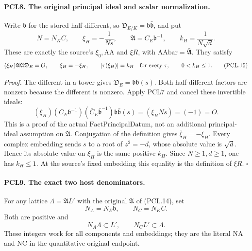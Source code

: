 \paragraph{PCL8. The original principal ideal and scalar normalization.}
\label{claim:PCL8}
Write \(\mathfrak b\) for the stored half-different, so
\(\mathfrak D_{E/K}=\mathfrak b\bar{\mathfrak b}\), and put
\[
 N=N_K C,\qquad
 \xi_H=-\frac1{Ns},\qquad
 \mathfrak A=C_E\mathfrak b^{-1},\qquad
 k_H=\frac1{N\sqrt d}.                              \tag{PCL.14}
\]
These are exactly the source's \(\xi_0,\mathrm{AA}\) and
\(\xi R\), with \(\mathrm{AAbar}=\bar{\mathfrak A}\).
They satisfy
\[
 (\xi_H)\mathfrak A\bar{\mathfrak A}\mathfrak D_E=O,
 \qquad \bar\xi_H=-\xi_H,
 \qquad |\tau(\xi_H)|=k_H\quad\hbox{for every }\tau,
 \qquad 0<k_H\le1.                                 \tag{PCL.15}
\]

\emph{Proof.}
The different in a tower gives
\(\mathfrak D_E=\mathfrak b\bar{\mathfrak b}(s)\).
Both half-different factors are nonzero because the
different is nonzero.  Apply PCL7 and cancel these
invertible ideals:
\[
 (\xi_H)(C_E\mathfrak b^{-1})
       (\bar C_E\bar{\mathfrak b}^{-1})
       \mathfrak b\bar{\mathfrak b}(s)
       =(\xi_H Ns)=(-1)=O.                          \tag{PCL.16}
\]
This is a proof of the actual \(\mathrm{FactPrincipalDatum}\),
not an additional principal-ideal assumption on
\(\mathfrak A\).  Conjugation of the definition gives
\(\bar\xi_H=-\xi_H\).  Every complex embedding sends
\(s\) to a root of \(z^2=-d\), whose absolute value is
\(\sqrt d\).  Hence its absolute value on \(\xi_H\)
is the same positive \(k_H\).  Since \(N\ge1,d\ge1\),
one has \(k_H\le1\).  At the source's fixed embedding
this equality is the definition of \(\xi R\).
\hfill\(\square\)

\paragraph{PCL9. The exact two host denominators.}
\label{claim:PCL9}
For any lattice \(\Lambda=\mathfrak A L'\) with the
original \(\mathfrak A\) of (PCL.14), set
\[
             N_A=N_E\mathfrak b,
             \qquad N_C=N_K C.                     \tag{PCL.17}
\]
Both are positive and
\[
               N_A\Lambda\subset L',\qquad
                           N_C L'\subset\Lambda.    \tag{PCL.18}
\]
These integers work for all components and embeddings;
they are the literal \(\mathrm{NA}\) and \(\mathrm{NC}\)
in the quantitative original endpoint.

